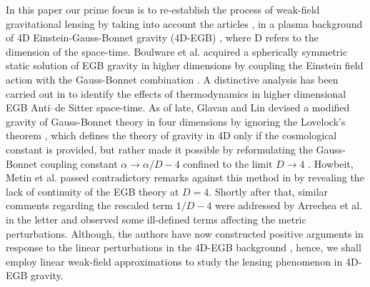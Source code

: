 \documentclass[final,5p,times,twocolumn,unknownkeysallowed]{elsarticle}
\begin{document}
In this paper our prime focus is to re-establish the process of weak-field gravitational lensing by taking into account the articles \cite{Bin:2010a,Abu:2013a,Abu:2017a}, in a plasma background of 4D Einstein-Gauss-Bonnet gravity (4D-EGB) \cite{Glav:2020a}, where D refers to the dimension of the space-time. Boulware et al. acquired a spherically symmetric static solution of EGB gravity in higher dimensions \cite{Boul:1985a}
by coupling the Einstein field action with the Gauss-Bonnet combination \cite{Bart:1985b}.
A distinctive analysis has been carried out in \cite{Cai:2002a} to identify the effects of thermodynamics in higher dimensional EGB Anti–de Sitter space-time. As of late, Glavan and Lin devised a modified gravity of Gauss-Bonnet theory in four dimensions by ignoring the Lovelock’s theorem
\cite{Dav:1971a}, which defines the theory of gravity in 4D only if the cosmological constant is provided, but rather made it
possible by reformulating the Gauss-Bonnet coupling constant $\alpha\rightarrow \alpha/D-4$ confined to the limit $D \rightarrow 4$ \cite{Glav:2020a}.
Howbeit, Metin et al. passed contradictory remarks against this method in \cite{Mg:2020a} by revealing the lack of continuity
of the EGB theory at $D=4$. Shortly after that, similar comments regarding the rescaled term $1/D-4$ were addressed by  Arrechea et al. in the letter \cite{Jul:2020a} and observed some ill-defined terms affecting the metric perturbations.
Although, the authors have now constructed positive arguments in response
to the linear perturbations in the 4D-EGB background \cite{Jul:2020b}, hence, we shall employ linear weak-field approximations to
study the lensing phenomenon in 4D-EGB gravity.
\end{document}
